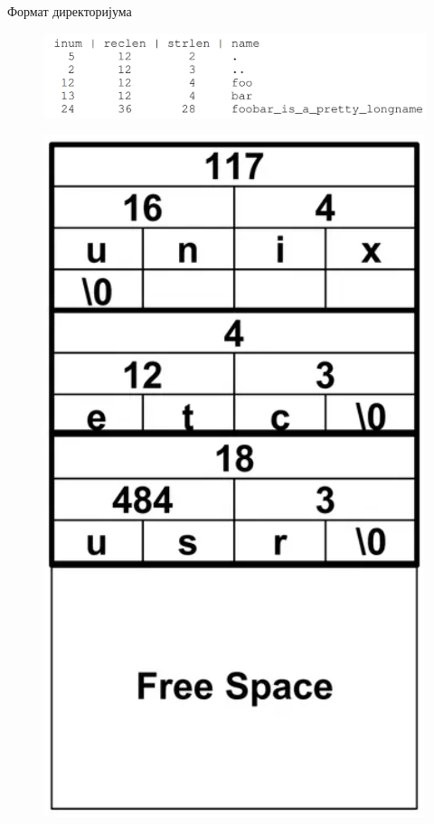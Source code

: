 \documentclass[xcolor=table]{beamer}
\begin{document}
    \begin{frame}[allowframebreaks]{Формат директоријума}
        \begin{figure}
            \centering
            \includegraphics[width=\textwidth,height=0.8\textheight,keepaspectratio]{images/dir_layout1.png}
            \label{fig:dir_layout1.png}
        \end{figure}
        
        \framebreak
        
        \begin{figure}
            \centering
            \includegraphics[width=\textwidth,height=0.8\textheight,keepaspectratio]{images/dir_layout2.png}
            \label{fig:dir_layout2.png}
        \end{figure}
    \end{frame}
    
\end{document}
